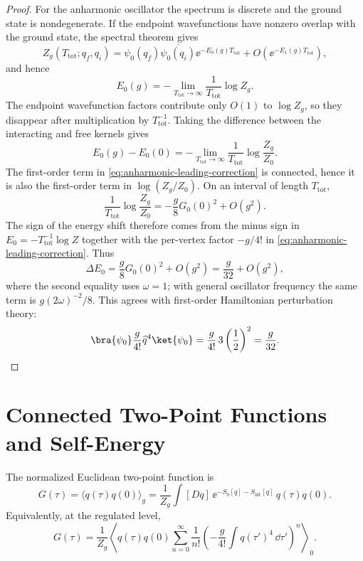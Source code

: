 \begin{proof}
For the anharmonic oscillator the spectrum is discrete and the ground state is
nondegenerate.  If the endpoint wavefunctions have nonzero overlap with the
ground state, the spectral theorem gives
\[
  Z_g(T_{\mathrm{tot}};q_f,q_i)
  =
  \psi_0(q_f)\overline{\psi_0(q_i)}
  \ee^{-E_0(g)T_{\mathrm{tot}}}
  +O(\ee^{-E_1(g)T_{\mathrm{tot}}}),
\]
and hence
\[
  E_0(g)
  =
  -\lim_{T_{\mathrm{tot}}\to\infty}
  \frac{1}{T_{\mathrm{tot}}}\log Z_g.
\]
The endpoint wavefunction factors contribute only \(O(1)\) to
\(\log Z_g\), so they disappear after multiplication by
\(T_{\mathrm{tot}}^{-1}\).  Taking the difference between the interacting and
free kernels gives
\[
  E_0(g)-E_0(0)
  =
  -\lim_{T_{\mathrm{tot}}\to\infty}
  \frac{1}{T_{\mathrm{tot}}}
  \log\frac{Z_g}{Z_0}.
\]
The first-order term in \eqref{eq:anharmonic-leading-correction} is
connected, hence it is also the first-order term in
\(\log(Z_g/Z_0)\).  On an interval of length \(T_{\mathrm{tot}}\),
\[
  \frac{1}{T_{\mathrm{tot}}}\log\frac{Z_g}{Z_0}
  =
  -\frac{g}{8}G_0(0)^2+O(g^2).
\]
The sign of the energy shift therefore comes from the minus sign in
\(E_0=-T_{\mathrm{tot}}^{-1}\log Z\) together with the per-vertex factor
\(-g/4!\) in \eqref{eq:anharmonic-leading-correction}. Thus
\[
  \Delta E_0
  =
  \frac{g}{8}G_0(0)^2+O(g^2)
  =
  \frac{g}{32}+O(g^2),
\]
where the second equality uses \(\omega=1\); with general oscillator frequency
the same term is \(g(2\omega)^{-2}/8\).
This agrees with first-order Hamiltonian perturbation theory:
\[
  \bra{\psi_0}\frac{g}{4!}\widehat q^4\ket{\psi_0}
  =
  \frac{g}{4!}\,3\left(\frac12\right)^2
  =
  \frac{g}{32}.
\]
\end{proof}

\section{Connected Two-Point Functions and Self-Energy}

The normalized Euclidean two-point function is
\[
  G(\tau)
  =
  \langle q(\tau)q(0)\rangle_g
  =
  \frac{1}{Z_g}
  \int[Dq]\,\ee^{-S_0[q]-S_{\mathrm{int}}[q]}\,q(\tau)q(0).
\]
Equivalently, at the regulated level,
\[
  G(\tau)
  =
  \frac{1}{Z_g}
  \left\langle
    q(\tau)q(0)
    \sum_{n=0}^{\infty}\frac{1}{n!}
    \left(-\frac{g}{4!}\int q(\tau')^4\,\dd\tau'\right)^n
  \right\rangle_0 .
\]
